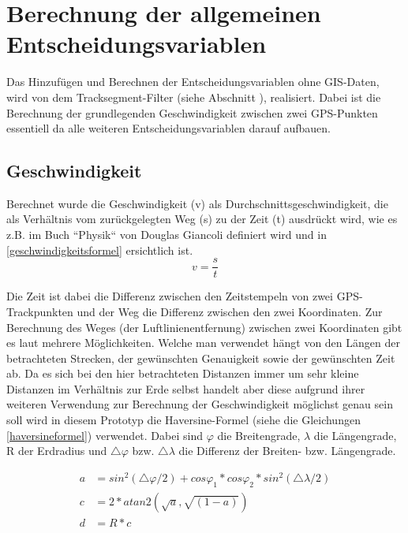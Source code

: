 \section{Berechnung der allgemeinen Entscheidungsvariablen}
Das Hinzufügen und Berechnen der Entscheidungsvariablen ohne GIS-Daten, wird von dem Tracksegment-Filter (siehe Abschnitt ), realisiert. Dabei ist die Berechnung der grundlegenden Geschwindigkeit zwischen zwei GPS-Punkten essentiell da alle weiteren Entscheidungsvariablen darauf aufbauen. 

\subsection{Geschwindigkeit}
Berechnet wurde die Geschwindigkeit (v) als Durchschnittsgeschwindigkeit, die als Verhältnis vom zurückgelegten Weg (s) zu der Zeit (t) ausdrückt wird, wie es z.B. im Buch ``Physik`` von Douglas Giancoli definiert wird \cite[S.~27]{douglas_giancoli_physik_2010} und in \ref{geschwindigkeitsformel} ersichtlich ist. 
\begin{equation}
v = \frac{s}{t}
\label{geschwindigkeitsformel}
\end{equation}

Die Zeit ist dabei die Differenz zwischen den Zeitstempeln von zwei GPS-Trackpunkten und der Weg die Differenz zwischen den zwei Koordinaten. Zur Berechnung des Weges (der Luftlinienentfernung) zwischen zwei Koordinaten gibt es laut \cite{movable_type_ltd_calculate_2015} mehrere Möglichkeiten. Welche man verwendet hängt von den Längen der betrachteten Strecken, der gewünschten Genauigkeit sowie der gewünschten Zeit ab. Da es sich bei den hier betrachteten Distanzen immer um sehr kleine Distanzen im Verhältnis zur Erde selbst handelt aber diese aufgrund ihrer weiteren Verwendung zur Berechnung der Geschwindigkeit möglichst genau sein soll wird in diesem Prototyp die Haversine-Formel (siehe die Gleichungen \ref{haversineformel}) verwendet. Dabei sind $\varphi$ die Breitengrade, $\lambda$ die Längengrade, R der Erdradius und $\triangle\varphi$ bzw. $\triangle \lambda$ die Differenz der Breiten- bzw. Längengrade.\cite{movable_type_ltd_calculate_2015}

\begin{equation}
\label{haversineformel}
\begin{aligned}
a &= sin^{2}(\triangle \varphi/2) + cos \varphi_1  * cos \varphi_2 * sin^{2}(\triangle \lambda/2) \\
c &= 2 * atan2( \sqrt{a}, \sqrt{(1-a)}) \\
d &= R * c
\end{aligned}
\end{equation}

